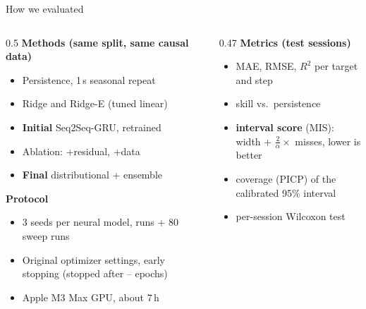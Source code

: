 \documentclass[aspectratio=169,11pt]{beamer}
\begin{document}
\begin{frame}{How we evaluated}
  \begin{columns}[T,onlytextwidth]
  \begin{column}{0.5\textwidth}
  \textbf{Methods (same split, same causal data)}
  \begin{itemize}\small
    \item Persistence, 1\,s seasonal repeat
    \item Ridge and Ridge-E (tuned linear)
    \item \textbf{Initial} Seq2Seq-GRU, retrained
    \item Ablation: +residual, +data
    \item \textbf{Final} distributional + ensemble
  \end{itemize}
  \textbf{Protocol}
  \begin{itemize}\small
    \item 3 seeds per neural model, \NRuns{} runs + 80 sweep runs
    \item Original optimizer settings, early stopping (stopped after \EpochsMin--\EpochsMax{} epochs)
    \item Apple M3 Max GPU, about 7\,h
  \end{itemize}
  \end{column}
  \begin{column}{0.47\textwidth}
  \textbf{Metrics (test sessions)}
  \begin{itemize}\small
    \item MAE, RMSE, $R^2$ per target and step
    \item skill vs.\ persistence
    \item \textbf{interval score} (MIS):\\ width + $\tfrac2\alpha\times$ misses, lower is better
    \item coverage (PICP) of the calibrated 95\% interval
    \item per-session Wilcoxon test
  \end{itemize}
  \end{column}
  \end{columns}
\end{frame}
\end{document}
